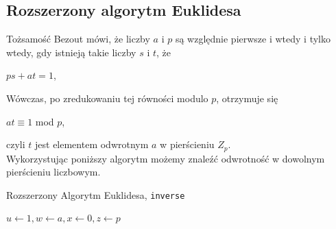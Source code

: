 \documentclass[]{article}
\begin{document}
	\subsection{Rozszerzony algorytm Euklidesa}
		Tożsamość Bezout mówi, że liczby $a$ i $p$ są względnie pierwsze i wtedy i tylko wtedy, gdy istnieją takie liczby $s$ i $t$, że
		\begin{center}
			$ps + at = 1$,
		\end{center}
		Wówczas, po zredukowaniu tej równości modulo $p$, otrzymuje się
		\begin{center}
			$at \equiv 1$ mod $p$,
		\end{center}
		 czyli $t$ jest elementem odwrotnym $a$ w pierścieniu $Z_{p}$. \\
		Wykorzystując poniższy algorytm możemy znaleźć odwrotność w dowolnym pierścieniu liczbowym.
		
		\begin{algorithm}[H]
			\label{extEuklid}
			\caption{Rozszerzony Algorytm Euklidesa, \texttt{inverse}}
			\BlankLine
			$u \leftarrow 1, w \leftarrow a, x \leftarrow 0,z \leftarrow p$ \\
		\end{algorithm}
	
\end{document}
